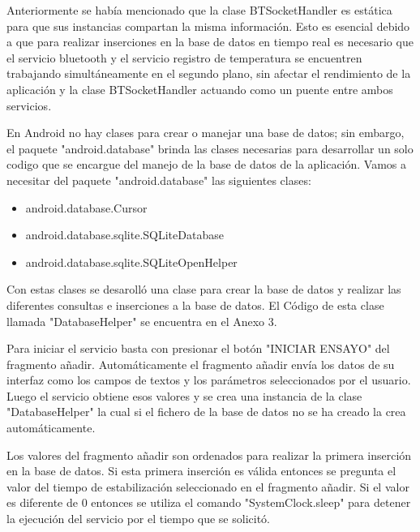 \par \noindent
Anteriormente se había mencionado que la clase BTSocketHandler es estática para que sus instancias compartan la misma información. Esto es esencial debido a que para realizar inserciones en la base de datos en tiempo real es necesario que el servicio bluetooth y el servicio registro de temperatura se encuentren trabajando simultáneamente en el segundo plano, sin afectar el rendimiento de la aplicación y la clase BTSocketHandler actuando como un puente entre ambos servicios.

\par \noindent
En Android no hay clases para crear o manejar una base de datos; sin embargo, el paquete "android.database" brinda las clases necesarias para desarrollar un solo codigo que se encargue del manejo de la base de datos de la aplicación. Vamos a necesitar del paquete "android.database" las siguientes clases:

\begin{itemize}
	
	\item android.database.Cursor
	
	\item android.database.sqlite.SQLiteDatabase
	
	\item android.database.sqlite.SQLiteOpenHelper
	
\end{itemize} 

\par \noindent
Con estas clases se desarolló una clase para crear la base de datos y realizar las diferentes consultas e inserciones a la base de datos. El Código de esta clase llamada "DatabaseHelper" se encuentra en el Anexo 3.

\par \noindent
Para iniciar el servicio basta con presionar el botón "INICIAR ENSAYO" del fragmento añadir. Automáticamente el fragmento añadir envía los datos de su interfaz como los campos de textos y los parámetros seleccionados por el usuario. Luego el servicio obtiene esos valores y se crea una instancia de la clase "DatabaseHelper" la cual si el fichero de la base de datos no se ha creado la crea automáticamente. 

\par \noindent
Los valores del fragmento añadir son ordenados para realizar la primera inserción en la base de datos. Si esta primera inserción es válida entonces se pregunta el valor del tiempo de estabilización seleccionado en el fragmento añadir. Si el valor es diferente de 0 entonces se utiliza el comando "SystemClock.sleep" para detener la ejecución del servicio por el tiempo que se solicitó.

